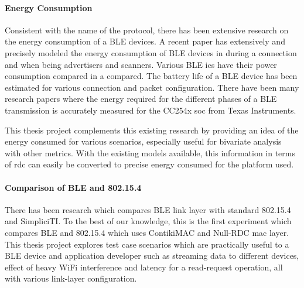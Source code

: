 \paragraph{Energy Consumption}
Consistent with the name of the protocol, there has been extensive research on the energy consumption of a BLE devices. A recent paper has extensively and precisely modeled the energy consumption of BLE devices in during a connection and when being advertisers and scanners\cite{Kindt2014}. Various BLE \glspl{ic} have their power consumption compared in a compared\cite{Bernegger2014}. The battery life of a BLE device has been estimated for various connection and packet configuration\cite{Gomez2012}. There have been many research papers where the energy required for the different phases of a BLE transmission is accurately measured\cite{Mikhaylov2013}\cite{Siekkinen2012}\cite{Mackensen2012}\cite{liu2012energy} for the CC254x \gls{soc} from Texas Instruments.

This thesis project complements this existing research by providing an idea of the energy consumed for various scenarios, especially useful for bivariate analysis with other metrics. With the existing models available, this information in terms of \gls{rdc} can easily be converted to precise energy consumed for the platform used.

\paragraph{Comparison of BLE and 802.15.4} There has been research which compares BLE link layer with standard 802.15.4\cite{Mikhaylov2013}\cite{Siekkinen2012} and  SimpliciTI\cite{Mikhaylov2013}. To the best of our knowledge, this is the first experiment which compares BLE and 802.15.4 which uses ContikiMAC and Null-RDC \gls{mac} layer. This thesis project explores test case scenarios which are practically useful to a BLE device and application developer such as streaming data to different devices, effect of heavy WiFi interference and latency for a read-request operation, all with various link-layer configuration. 